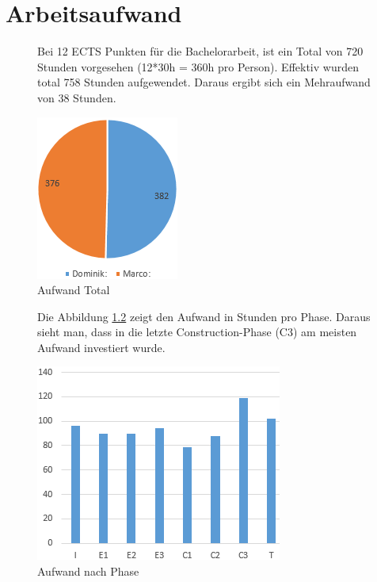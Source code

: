 \pagebreak
\chapter{Arbeitsaufwand}



\begin{figure}[htbp]
	\begin{minipage}{0.5\textwidth} 
Bei 12 ECTS Punkten für die Bachelorarbeit, ist ein Total von 720 Stunden vorgesehen (12*30h = 360h pro Person). Effektiv wurden total 758 Stunden aufgewendet. Daraus ergibt sich ein Mehraufwand von 38 Stunden.
	\end{minipage}
	\hfill
	\begin{minipage}{0.45\textwidth}
		\includegraphics[scale=0.65]{appendix/img/aufwand1}
		\caption{Aufwand Total}
		\label{fig:aufwand1}
	\end{minipage}
\end{figure}

\begin{figure}[htbp]
	\begin{minipage}{0.5\textwidth} 
Die Abbildung \ref{fig:aufwand2} zeigt den Aufwand in Stunden pro Phase. Daraus sieht man, dass in die letzte Construction-Phase (C3) am meisten Aufwand investiert wurde.
	\end{minipage}
	\hfill
	\begin{minipage}{0.45\textwidth}
		\includegraphics[scale=0.65]{appendix/img/aufwand2}
		\caption{Aufwand nach Phase}
		\label{fig:aufwand2}
	\end{minipage}
\end{figure}

